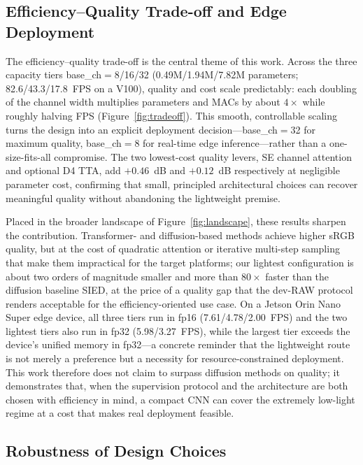 \documentclass[remotesensing,article,accept,moreauthors]{Definitions/mdpi}
\begin{document}
\subsection{Efficiency--Quality Trade-off and Edge Deployment}

The efficiency--quality trade-off is the central theme of this work. Across the three capacity tiers base\_ch$=$8/16/32 (0.49M/1.94M/7.82M parameters; 82.6/43.3/17.8~FPS on a V100), quality and cost scale predictably: each doubling of the channel width multiplies parameters and MACs by about $4\times$ while roughly halving FPS (Figure~\ref{fig:tradeoff}). This smooth, controllable scaling turns the design into an explicit deployment decision---base\_ch$=$32 for maximum quality, base\_ch$=$8 for real-time edge inference---rather than a one-size-fits-all compromise. The two lowest-cost quality levers, SE channel attention and optional D4 TTA, add $+0.46$~dB and $+0.12$~dB respectively at negligible parameter cost, confirming that small, principled architectural choices can recover meaningful quality without abandoning the lightweight premise.

Placed in the broader landscape of Figure~\ref{fig:landscape}, these results sharpen the contribution. Transformer- and diffusion-based methods achieve higher sRGB quality, but at the cost of quadratic attention or iterative multi-step sampling that make them impractical for the target platforms; our lightest configuration is about two orders of magnitude smaller and more than $80\times$ faster than the diffusion baseline SIED, at the price of a quality gap that the dev-RAW protocol renders acceptable for the efficiency-oriented use case. On a Jetson Orin Nano Super edge device, all three tiers run in fp16 (7.61/4.78/2.00~FPS) and the two lightest tiers also run in fp32 (5.98/3.27~FPS), while the largest tier exceeds the device's unified memory in fp32---a concrete reminder that the lightweight route is not merely a preference but a necessity for resource-constrained deployment. This work therefore does not claim to surpass diffusion methods on quality; it demonstrates that, when the supervision protocol and the architecture are both chosen with efficiency in mind, a compact CNN can cover the extremely low-light regime at a cost that makes real deployment feasible.

\subsection{Robustness of Design Choices}
\end{document}
